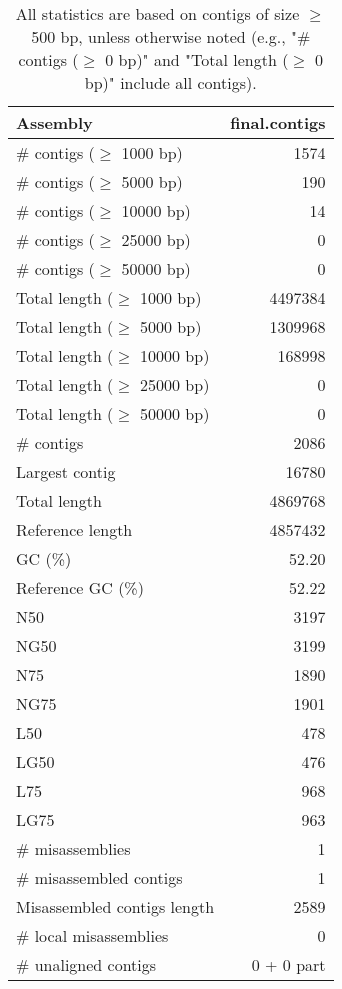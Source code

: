 \documentclass[12pt,a4paper]{article}
\begin{document}
\begin{table}[ht]
\begin{center}
\caption{All statistics are based on contigs of size $\geq$ 500 bp, unless otherwise noted (e.g., "\# contigs ($\geq$ 0 bp)" and "Total length ($\geq$ 0 bp)" include all contigs).}
\begin{tabular}{|l*{1}{|r}|}
\hline
Assembly & final.contigs \\ \hline
\# contigs ($\geq$ 1000 bp) & 1574 \\ \hline
\# contigs ($\geq$ 5000 bp) & 190 \\ \hline
\# contigs ($\geq$ 10000 bp) & 14 \\ \hline
\# contigs ($\geq$ 25000 bp) & 0 \\ \hline
\# contigs ($\geq$ 50000 bp) & 0 \\ \hline
Total length ($\geq$ 1000 bp) & 4497384 \\ \hline
Total length ($\geq$ 5000 bp) & 1309968 \\ \hline
Total length ($\geq$ 10000 bp) & 168998 \\ \hline
Total length ($\geq$ 25000 bp) & 0 \\ \hline
Total length ($\geq$ 50000 bp) & 0 \\ \hline
\# contigs & 2086 \\ \hline
Largest contig & 16780 \\ \hline
Total length & 4869768 \\ \hline
Reference length & 4857432 \\ \hline
GC (\%) & 52.20 \\ \hline
Reference GC (\%) & 52.22 \\ \hline
N50 & 3197 \\ \hline
NG50 & 3199 \\ \hline
N75 & 1890 \\ \hline
NG75 & 1901 \\ \hline
L50 & 478 \\ \hline
LG50 & 476 \\ \hline
L75 & 968 \\ \hline
LG75 & 963 \\ \hline
\# misassemblies & 1 \\ \hline
\# misassembled contigs & 1 \\ \hline
Misassembled contigs length & 2589 \\ \hline
\# local misassemblies & 0 \\ \hline
\# unaligned contigs & 0 + 0 part \\ \hline

\end{tabular}
\end{center}
\end{table}
\end{document}
